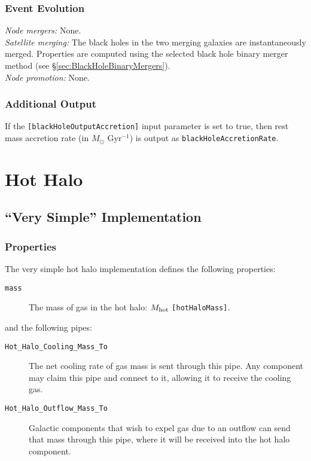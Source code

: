 \subsubsection{Event Evolution}

\noindent\emph{Node mergers:} None.\\

\noindent\emph{Satellite merging:} The black holes in the two merging galaxies are instantaneously merged. Properties are computed using the selected black hole binary merger method (see \S\ref{sec:BlackHoleBinaryMergers}).\\

\noindent\emph{Node promotion:} None.\\

\subsubsection{Additional Output}

If the {\tt [blackHoleOutputAccretion]} input parameter is set to true, then rest mass accretion rate (in $M_\odot$ Gyr$^{-1}$) is output as {\tt blackHoleAccretionRate}.

\section{Hot Halo}

\subsection{``Very Simple'' Implementation}

\subsubsection{Properties}

The very simple hot halo implementation defines the following properties:
\begin{description}
 \item [{\tt mass}] The mass of gas in the hot halo: $M_{\rm hot}$ {\tt [hotHaloMass]}.
\end{description}
and the following pipes:
\begin{description}
 \item [{\tt Hot\_Halo\_Cooling\_Mass\_To}] The net cooling rate of gas mass is sent through this pipe. Any \gls{component} may claim this pipe and connect to it, allowing it to receive the cooling gas.
 \item [{\tt Hot\_Halo\_Outflow\_Mass\_To}] Galactic components that wish to expel gas due to an outflow can send that mass  through this pipe, where it will be received into the hot halo component. 
\end{description}


